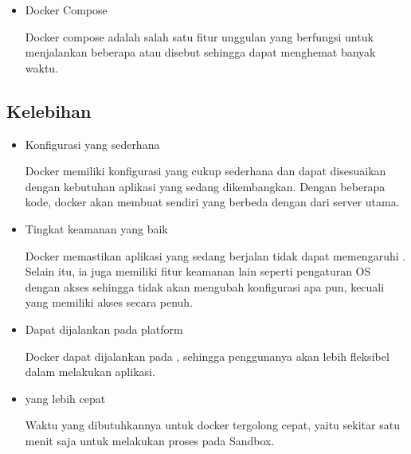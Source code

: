 {{\begin{itemize}
  Docker hub adalah  yang berisikan kumpulan dari berbagai  yang disimpan di  milik docker.
  Dengan menggunakan docker hub ini memungkinkan pengguna untuk dapat mengumpulkan dan mendapatkan .  

  \item Docker Compose
  
  Docker compose adalah salah satu fitur unggulan yang berfungsi untuk menjalankan beberapa  atau disebut  sehingga dapat menghemat banyak waktu.

\end{itemize}

\subsection{Kelebihan}
\begin{itemize}
  \item Konfigurasi yang sederhana
  
  Docker memiliki konfigurasi yang cukup sederhana dan dapat disesuaikan dengan kebutuhan aplikasi yang sedang dikembangkan.
  Dengan beberapa kode, docker akan membuat  sendiri yang berbeda dengan  dari server utama.

  \item Tingkat keamanan yang baik
  
  Docker memastikan aplikasi yang sedang berjalan tidak dapat memengaruhi .
  Selain itu, ia juga memiliki fitur keamanan lain seperti pengaturan OS  dengan akses  sehingga tidak akan mengubah konfigurasi apa pun, kecuali  yang memiliki akses secara penuh.

  \item Dapat dijalankan pada platform 
  
  Docker dapat dijalankan pada , sehingga penggunanya akan lebih fleksibel dalam melakukan  aplikasi.

  \item {} yang lebih cepat
  
  Waktu yang dibutuhkannya untuk  docker  tergolong cepat, yaitu sekitar satu menit saja untuk melakukan proses  pada Sandbox.

\end{itemize}

}}
